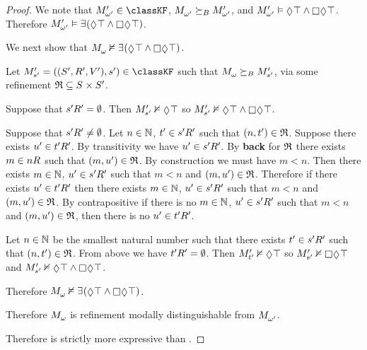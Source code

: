 \begin{proof}
We note that $\kPModelP{\omega'} \in \classKF$, $\kPModel{\omega'} \simulatesBs \kPModelP{\omega'}$, and $\kPModelP{\omega'} \entails \possible \top \land \necessary \possible \top$.
Therefore $\kPModelP{\omega'} \entails \somerefs (\possible \top \land \necessary \possible \top)$.

We next show that $\kPModel{\omega} \nentails \somerefs (\possible \top \land \necessary \possible \top)$.

Let $\kPModelAndTupleP{\kStateSP} \in \classKF$ such that $\kPModel{\omega} \simulatesBs \kPModelP{\kStateSP}$, via some refinement $\refinement \subseteq \kStates \times \kStatesP$.

Suppose that ${{s}^{\prime}} {R^{\prime}_{}} = \emptyset$.
Then $\kPModelP{\kStateSP} \nentails \possible \top$ so $\kPModelP{\kStateSP} \nentails \possible \top \land \necessary \possible \top$.

Suppose that ${{s}^{\prime}} {R^{\prime}_{}} \neq \emptyset$.
Let $n \in \mathbb{N}$, ${t}^{\prime} \in {{s}^{\prime}} {R^{\prime}_{}}$ such that $(n, {t}^{\prime}) \in \mathfrak{R}$.
Suppose there exists ${u}^{\prime} \in {{t}^{\prime}} {R^{\prime}_{}}$.
By transitivity we have ${u}^{\prime} \in {{s}^{\prime}} {R^{\prime}_{}}$.
By {\bf back} for $\mathfrak{R}$ there exists $m \in \kSuccessors{}{n}$ such that $(m, {u}^{\prime}) \in \mathfrak{R}$.
By construction we must have $m < n$.
Then there exists $m \in \mathbb{N}$, ${u}^{\prime} \in {{s}^{\prime}} {R^{\prime}_{}}$ such that $m < n$ and $(m, {u}^{\prime}) \in \mathfrak{R}$.
Therefore if there exists ${u}^{\prime} \in {{t}^{\prime}} {R^{\prime}_{}}$ then there exists $m \in \mathbb{N}$, ${u}^{\prime} \in {{s}^{\prime}} {R^{\prime}_{}}$ such that $m < n$ and $(m, {u}^{\prime}) \in \mathfrak{R}$.
By contrapositive if there is no $m \in \mathbb{N}$, ${u}^{\prime} \in {{s}^{\prime}} {R^{\prime}_{}}$ such that $m < n$ and $(m, {u}^{\prime}) \in \mathfrak{R}$, then there is no ${u}^{\prime} \in {{t}^{\prime}} {R^{\prime}_{}}$.

Let $n \in \mathbb{N}$ be the smallest natural number such that there exists ${t}^{\prime} \in {{s}^{\prime}} {R^{\prime}_{}}$ such that $(n, {t}^{\prime}) \in \mathfrak{R}$.
From above we have ${{t}^{\prime}} {R^{\prime}_{}} = \emptyset$. 
Then $\kPModelP{\kStateTP} \nentails \possible \top$ so $\kPModelP{\kStateSP} \nentails \necessary \possible \top$ and $\kPModelP{\kStateSP} \nentails \possible \top \land \necessary \possible \top$.

Therefore $\kPModel{\omega} \nentails \somerefs (\possible \top \land \necessary \possible \top)$.

Therefore $\kPModel{\omega}$ is refinement modally distinguishable from $\kPModel{\omega'}$.

Therefore \logicRmlKF{} is strictly more expressive than \logicKF{}.
\end{proof}

